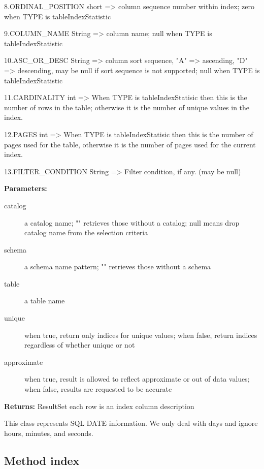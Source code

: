 8.ORDINAL\_POSITION short => column sequence number within index; zero when TYPE is tableIndexStatistic 

9.COLUMN\_NAME String => column name; null when TYPE is tableIndexStatistic 

10.ASC\_OR\_DESC String => column sort sequence, "A" => ascending, "D" => descending, may be null if sort sequence is not supported; null when TYPE is tableIndexStatistic 

11.CARDINALITY int => When TYPE is tableIndexStatisic then this is the number of rows in the table; otherwise it is the number of unique values in the index. 

12.PAGES int => When TYPE is tableIndexStatisic then this is the number of pages used for the table, otherwise it is the number of pages used for the current index. 

13.FILTER\_CONDITION String => Filter condition, if any. (may be null) 


{\bf Parameters: }
\begin{description}
\item[catalog] a catalog name; "" retrieves those without a catalog; null means drop catalog name from the selection criteria 
\item[schema] a schema name pattern; "" retrieves those without a schema 
\item[table] a table name 
\item[unique] when true, return only indices for unique values; when false, return indices regardless of whether unique or not 
\item[approximate] when true, result is allowed to reflect approximate or out of data values; when false, results are requested to be accurate 
\end{description}

{\bf Returns: } 
ResultSet each row is an index column description 


\renewcommand{\CurClass}{Date}
\Class{}

This class represents SQL DATE information. 
We only deal with days and ignore hours,
minutes, and seconds. 



\subsection{Method index}

